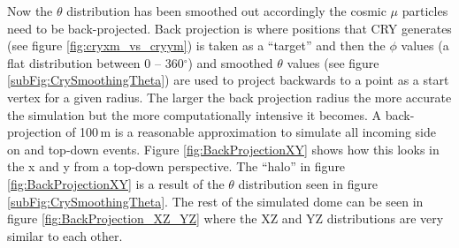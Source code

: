 Now the $\theta$ distribution has been smoothed out accordingly the cosmic $\mu$ particles need to be back-projected. Back projection is where positions that CRY generates (see figure \ref{fig:cryxm_vs_cryym}) is taken as a ``target'' and then the $\phi$ values (a flat distribution between 0 -- 360$^\circ$) and smoothed $\theta$ values (see figure \ref{subFig:CrySmoothingTheta}) are used to project backwards to a point as a start vertex for a given radius. The larger the back projection radius the more accurate the simulation but the more computationally intensive it becomes. A back-projection of 100\,m is a reasonable approximation to simulate all incoming side on and top-down events. Figure \ref{fig:BackProjectionXY} shows how this looks in the x and y from a top-down perspective. The ``halo'' in figure \ref{fig:BackProjectionXY} is a result of the $\theta$ distribution seen in figure \ref{subFig:CrySmoothingTheta}. The rest of the simulated dome can be seen in figure \ref{fig:BackProjection_XZ_YZ} where the XZ and YZ distributions are very similar to each other. 


